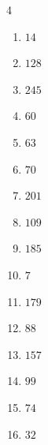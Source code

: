 \begin{multicols}{4}
\begin{enumerate}
  \item $14$


  \item $128$


  \item $245$


\columnbreak %

  \item $60$


  \item $63$


  \item $70$


  \item $201$


  \item $109$


  \item $185$


  \item $7$


  \item $179$


  \item $88$


  \item $157$


  \item $99$


  \item $74$


  \item $32$


\end{enumerate}
\end{multicols}
